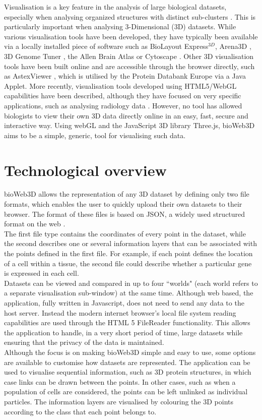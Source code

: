 \documentclass{bioinfo}
\begin{document}
Visualisation is a key feature in the analysis of large biological datasets, especially when analysing organized structures with distinct sub-clusters \citep{Rubel10}. This is particularly important when analysing 3-Dimensional (3D) datasets. While various visualisation tools have been developed, they have typically been available via a locally installed piece of software such as BioLayout Express$^{3D}$\citep{Freeman07}, Arena3D \citep{Pavlopoulos08},  3D Genome Tuner \citep{Wang09}, the Allen Brain Atlas \citep{Lein07} or Cytoscape \citep{Shannon03}. Other 3D visualisation tools have been built online and are accessible through the browser directly, such as AstexViewer \citep{Hartshorn02}, which is utilised by the Protein Databank Europe via a Java Applet. More recently, visualisation tools developed using HTML5/WebGL capabilities have been described, although they have focused on very specific applications, such as analysing radiology data  \citep{Dinesh12}. However, no tool has allowed biologists to view their own 3D data directly online in an easy, fast, secure and interactive way. Using webGL and the JavaScript 3D library Three.js, bioWeb3D aims to be a simple, generic, tool for visualising such data.



\section{Technological overview}

bioWeb3D allows the representation of any 3D dataset by defining only two file formats, which enables the user to quickly upload their own datasets to their browser. The format of these files is based on JSON, a widely used structured format on the web \citep{Wilde07}.\\
The first file type contains the coordinates of every point in the dataset, while the second describes one or several information layers that can be associated with the points defined in the first file. For example, if each point defines the location of a cell within a tissue, the second file could describe whether a particular gene is expressed in each cell. \\
Datasets can be viewed and compared in up to four ``worlds" (each world refers to a separate visualisation sub-window) at the same time. Although web based, the application, fully written in Javascript, does not need to send any data to the host server. Instead the modern internet browser's local file system reading capabilities are used through the HTML 5 FileReader functionality. This allows the application to handle, in a very short period of time, large datasets while ensuring that the privacy of the data is maintained.\\
Although the focus is on making bioWeb3D simple and easy to use, some options are available to customise how datasets are represented. The application can be used to visualise sequential information, such as 3D protein structures, in which case links can be drawn between the points. In other cases, such as when a population of cells are considered, the points can be left unlinked as individual particles. The information layers are visualised by colouring the 3D points according to the class that each point belongs to.
\end{document}
